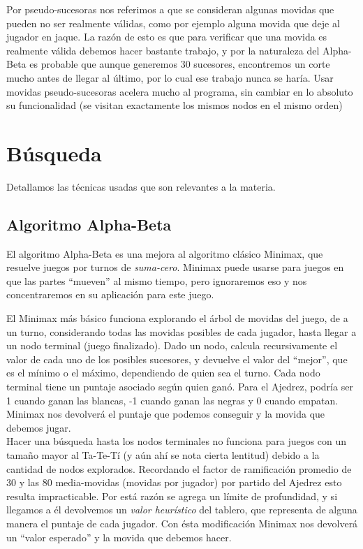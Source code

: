 \documentclass{article}
\begin{document}
Por pseudo-sucesoras nos referimos a que se consideran algunas movidas
que pueden no ser realmente válidas, como por ejemplo alguna movida que
deje al jugador en jaque. La razón de esto es que para verificar que
una movida es realmente válida debemos hacer bastante trabajo, y por la
naturaleza del Alpha-Beta es probable que aunque generemos 30 sucesores,
encontremos un corte mucho antes de llegar al último, por lo cual ese
trabajo nunca se haría. Usar movidas pseudo-sucesoras acelera mucho
al programa, sin cambiar en lo absoluto su funcionalidad (se visitan
exactamente los mismos nodos en el mismo orden)
\\

\section{Búsqueda}
Detallamos las técnicas usadas que son relevantes a la materia.

\subsection{Algoritmo Alpha-Beta}

El algoritmo Alpha-Beta es una mejora al algoritmo clásico Minimax, que
resuelve juegos por turnos de \emph{suma-cero}\footnotemark . Minimax
puede usarse para juegos en que las partes ``mueven'' al mismo tiempo,
pero ignoraremos eso y nos concentraremos en su aplicación para este
juego.
\\


El Minimax más básico funciona explorando el árbol de movidas del
juego, de a un turno, considerando todas las movidas posibles de cada
jugador, hasta llegar a un nodo terminal (juego finalizado). Dado un
nodo, calcula recursivamente el valor de cada uno de los posibles
sucesores, y devuelve el valor del ``mejor'', que es el mínimo o el
máximo, dependiendo de quien sea el turno. Cada nodo terminal tiene
un puntaje asociado según quien ganó. Para el Ajedrez, podría ser 1
cuando ganan las blancas, -1 cuando ganan las negras y 0 cuando empatan.
Minimax nos devolverá el puntaje que podemos conseguir y la movida que
debemos jugar.
\\

Hacer una búsqueda hasta los nodos terminales no funciona para juegos
con un tamaño mayor al Ta-Te-Tí (y aún ahí se nota cierta lentitud)
debido a la cantidad de nodos explorados. Recordando el factor de
ramificación promedio de 30 y las 80 media-movidas (movidas por
jugador) por partido del Ajedrez esto resulta impracticable. Por
está razón se agrega un límite de profundidad, y si llegamos a él
devolvemos un \emph{valor heurístico} del tablero, que representa
de alguna manera el puntaje de cada jugador. Con ésta modificación
Minimax nos devolverá un ``valor esperado'' y la movida que debemos
hacer.
\\
\end{document}
